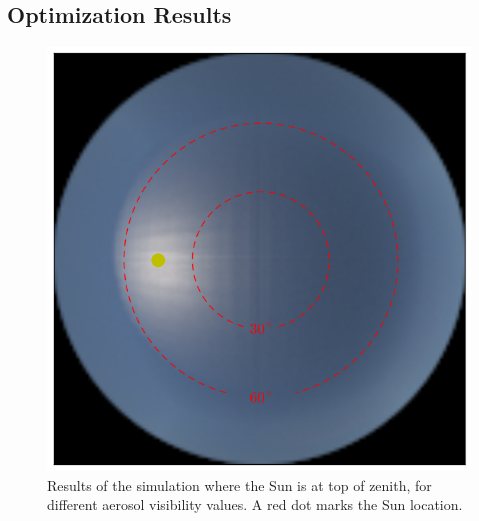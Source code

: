 \documentclass[10pt,twocolumn,letterpaper]{article}
\begin{document}
\subsection{Optimization Results}
\label{sec:optimization-results}
\begin{figure}
 \includegraphics[width=\columnwidth]{images/ref_img34.png}
  \caption{Results of the simulation where the Sun is at top of
    zenith, for different aerosol visibility values. A red dot marks
    the Sun location.}
  \label{fig:simulation-results1}
\end{figure}
\end{document}
